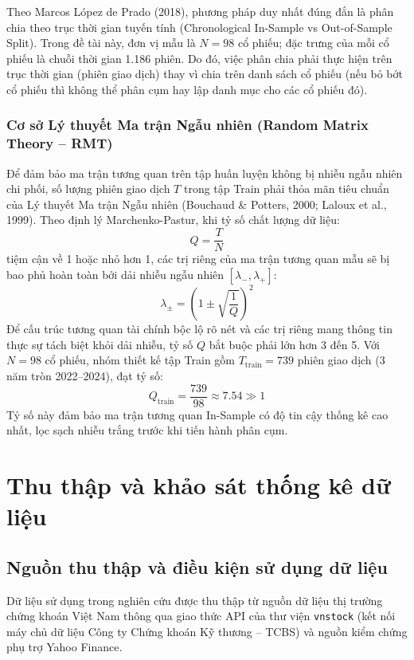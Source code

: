 \documentclass[12pt,a4paper,oneside,openany]{report}
\begin{document}
Theo Marcos López de Prado (2018), phương pháp duy nhất đúng đắn là phân chia theo trục thời gian tuyến tính (Chronological In-Sample vs Out-of-Sample Split). Trong đề tài này, đơn vị mẫu là $N = 98$ cổ phiếu; đặc trưng của mỗi cổ phiếu là chuỗi thời gian 1.186 phiên. Do đó, việc phân chia phải thực hiện trên trục thời gian (phiên giao dịch) thay vì chia trên danh sách cổ phiếu (nếu bỏ bớt cổ phiếu thì không thể phân cụm hay lập danh mục cho các cổ phiếu đó).

\subsection{Cơ sở Lý thuyết Ma trận Ngẫu nhiên (Random Matrix Theory -- RMT)}
Để đảm bảo ma trận tương quan trên tập huấn luyện không bị nhiễu ngẫu nhiên chi phối, số lượng phiên giao dịch $T$ trong tập Train phải thỏa mãn tiêu chuẩn của Lý thuyết Ma trận Ngẫu nhiên (Bouchaud \& Potters, 2000; Laloux et al., 1999). Theo định lý Marchenko-Pastur, khi tỷ số chất lượng dữ liệu:
\begin{equation}
  Q = \frac{T}{N}
\end{equation}
tiệm cận về 1 hoặc nhỏ hơn 1, các trị riêng của ma trận tương quan mẫu sẽ bị bao phủ hoàn toàn bởi dải nhiễu ngẫu nhiên $[\lambda_-, \lambda_+]$:
\begin{equation}
  \lambda_{\pm} = \left(1 \pm \sqrt{\frac{1}{Q}}\right)^2
\end{equation}
Để cấu trúc tương quan tài chính bộc lộ rõ nét và các trị riêng mang thông tin thực sự tách biệt khỏi dải nhiễu, tỷ số $Q$ bắt buộc phải lớn hơn 3 đến 5. Với $N = 98$ cổ phiếu, nhóm thiết kế tập Train gồm $T_{\text{train}} = 739$ phiên giao dịch (3 năm tròn 2022--2024), đạt tỷ số:
\begin{equation}
  Q_{\text{train}} = \frac{739}{98} \approx 7.54 \gg 1
\end{equation}
Tỷ số này đảm bảo ma trận tương quan In-Sample có độ tin cậy thống kê cao nhất, lọc sạch nhiễu trắng trước khi tiến hành phân cụm.

\chapter{Thu thập và khảo sát thống kê dữ liệu}
\label{chap:thuthapvakhaosat}

\section{Nguồn thu thập và điều kiện sử dụng dữ liệu}
Dữ liệu sử dụng trong nghiên cứu được thu thập từ nguồn dữ liệu thị trường chứng khoán Việt Nam thông qua giao thức API của thư viện \texttt{vnstock} (kết nối máy chủ dữ liệu Công ty Chứng khoán Kỹ thương -- TCBS) và nguồn kiểm chứng phụ trợ Yahoo Finance. 
\end{document}
